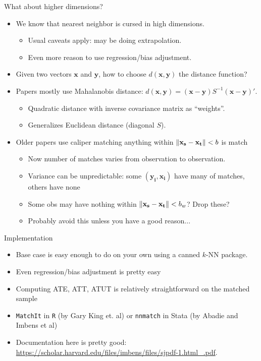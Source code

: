 \documentclass[aspectratio=169,11pt]{beamer}
\begin{document}
\begin{frame}{What about higher dimensions?}
\begin{itemize}
\item We know that nearest neighbor is \alert{cursed} in high dimensions.
\begin{itemize}
\item Usual caveats apply: may be doing \alert{extrapolation}.
\item Even more reason to use regression/bias adjustment.
\end{itemize}
\item Given two vectors $\mathbf{x}$ and $\mathbf{y}$, how to choose $d(\mathbf{x},\mathbf{y})$ the \alert{distance} function?
\item Papers mostly use \alert{Mahalanobis distance}: $d(\mathbf{x},\mathbf{y}) = (\mathbf{x}-\mathbf{y}) S^{-1} (\mathbf{x}-\mathbf{y})'$.
\begin{itemize}
\item Quadratic distance with inverse covariance matrix as ``weights''.
\item Generalizes Euclidean distance (diagonal $S$).
\end{itemize}
\item Older papers use \alert{caliper matching} anything within $\lVert\mathbf{x_s} -\mathbf{x_t}\rVert<b$ is match
\begin{itemize}
\item Now number of matches varies from observation to observation.
\item Variance can be unpredictable: some $(\mathbf{y_i},\mathbf{x_i})$ have many of matches, others have none
\item Some obs may have nothing within $\lVert\mathbf{x_s} -\mathbf{x_t}\rVert<b_w$? Drop these?
\item Probably avoid this unless you have a good reason...
\end{itemize}
\end{itemize}
\end{frame}

\begin{frame}{Implementation}
\begin{itemize}
\item Base case is easy enough to do on your own using a canned $k$-NN package.
\item Even regression/bias adjustment is pretty easy
\item Computing ATE, ATT, ATUT is relatively straightforward on the matched sample
\item \texttt{MatchIt} in \texttt{R} (by Gary King et. al)  or \texttt{nnmatch} in Stata (by Abadie and Imbens et al)
\item Documentation here is pretty good: \url{https://scholar.harvard.edu/files/imbens/files/sjpdf-1.html_.pdf}.
\end{itemize}
\end{frame}
\end{document}
